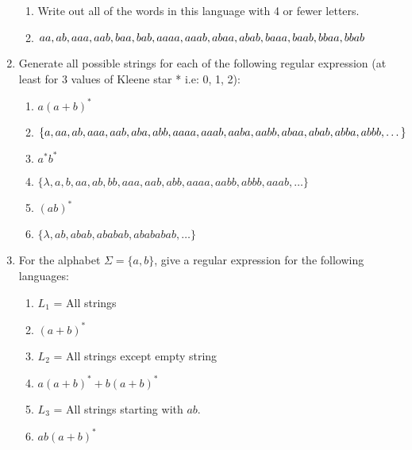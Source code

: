 \documentclass[12pt]{article}
\makeatletter
\renewenvironment{proof}[1][\proofname]{\par
  \normalfont \topsep6\p@\@plus6\p@\relax
  \trivlist
  \item[\hskip\labelsep
        \itshape
    #1\@addpunct{.}]\ignorespaces
}{%
  \endtrivlist\@endpefalse
}
\renewcommand{\proofname}{Solution:}
\makeatother
\begin{document}
\begin{enumerate}
\begin{enumerate}
        \item Write out all of the words in this language with 4 or fewer letters.
        \begin{proof}
            $aa, ab, aaa, aab, baa, bab, aaaa, aaab, abaa, abab, baaa, baab, bbaa, bbab \hfill$
        \end{proof}
    \end{enumerate}

    \item Generate all possible strings for each of the following regular expression (at least for 3 values of Kleene star * i.e: 0, 1, 2):

    \begin{enumerate}
        \item $a(a+b)^*$
        \begin{proof}
            $\{a, aa, ab, aaa, aab, aba, abb, aaaa, aaab, aaba, aabb, abaa, abab, abba, \\ abbb, \dots\}$
        \end{proof}

        \item $a^*b^*$
        \begin{proof}
            $\{\lambda, a, b, aa, ab, bb, aaa, aab, abb, aaaa, aabb, abbb, aaab, \dots\}$
        \end{proof}

        \item $(ab)^*$
        \begin{proof}
            $\{\lambda, ab, abab, ababab, abababab, \dots\}$
        \end{proof}
    \end{enumerate}

    \newpage

    \item For the alphabet $\Sigma=\{a, b\}$, give a regular expression for the following languages: 
    \begin{enumerate}
        \item $L_1$ = All strings
        \begin{proof}
            $(a+b)^*$
        \end{proof}
        
        \item $L_2$ = All strings except empty string
        \begin{proof}
            $a(a+b)^*+b(a+b)^*$
        \end{proof}

        \item $L_3$ = All strings starting with $ab$.
        \begin{proof}
            $ab(a+b)^*$
        \end{proof}


\end{enumerate}
\end{enumerate}
\end{document}
